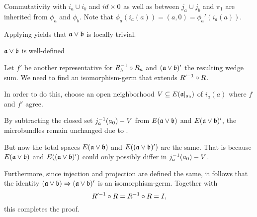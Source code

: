 \begin{myproof}
\begin{sectionize}
\begin{caselist}
Commutativity with $i_a \cup i_b$ and $id \times 0$ as well as between $j_a \cup j_b$ and $\pi_1$ are inherited from $\phi_a$ and $\phi_b$. Note that $\phi_a(i_a(a)) = (a, 0) = \phi_a'(i_a(a))$.

Applying  yields that $\ba \vee \bb$ is locally trivial. \end{caselist}

\item $\ba \vee \bb$ is well-defined

Let $f'$ be another representative for $R_b^{-1} \circ R_a$ and $(\ba \vee \bb)'$ the resulting wedge sum. We need to find an isomorphism-germ that extends $R'^{-1} \circ R$.

In order to do this, choose an open neighborhood $V \subseteq{} E(\mathfrak{a}\vert_{a_0})$ of $i_a(a)$ where $f$ and $f'$ agree.

By subtracting the closed set $j_a^{-1}(a_0) - V$ from $E(\ba \vee \bb)$ and $E(\ba \vee \bb)'$, the microbundles remain unchanged due to .

But now the total spaces $E(\ba \vee \bb)$ and $E((\ba \vee \bb)')$ are the same. That is because $E(\ba \vee \bb)$ and $E((\ba \vee \bb)')$ could only possibly differ in $j_a^{-1}(a_0) - V$.

Furthermore, since injection and projection are defined the same, it follows that the identity $\germ{(\ba \vee \bb)}{(\ba \vee \bb)'}$ is an isomorphism-germ. Together with \[ R'^{-1} \circ R = R^{-1} \circ R = I, \] this completes the proof. \end{sectionize} \end{myproof}
